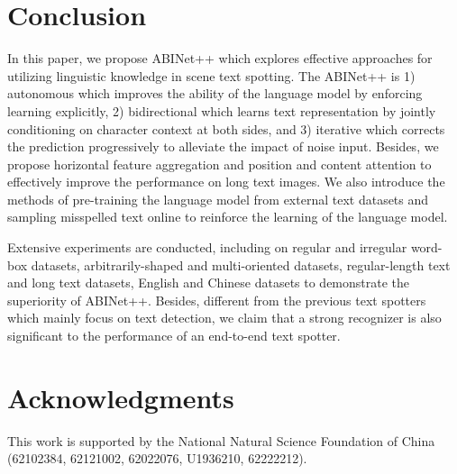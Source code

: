 \documentclass[10pt,journal,compsoc]{IEEEtran}
\begin{document}
\section{Conclusion}

In this paper, we propose ABINet++ which explores effective approaches for utilizing linguistic knowledge in scene text spotting. The ABINet++ is 1) autonomous which improves the ability of the language model by enforcing learning explicitly, 2) bidirectional which learns text representation by jointly conditioning on character context at both sides, and 3) iterative which corrects the prediction progressively to alleviate the impact of noise input. Besides, we propose horizontal feature aggregation and position and content attention to effectively improve the performance on long text images. We also introduce the methods of pre-training the language model from external text datasets and sampling misspelled text online to reinforce the learning of the language model. 

Extensive experiments are conducted, including on regular and irregular word-box datasets, arbitrarily-shaped and multi-oriented datasets, regular-length text and long text datasets, English and Chinese datasets to demonstrate the superiority of ABINet++. Besides, different from the previous text spotters which mainly focus on text detection, we claim that a strong recognizer is also significant to the performance of an end-to-end text spotter.


\section*{Acknowledgments}

This work is supported by the National Natural Science Foundation of China (62102384, 62121002, 62022076, U1936210, 62222212).


\ifCLASSOPTIONcaptionsoff
  \newpage
\fi


{


}
\end{document}
